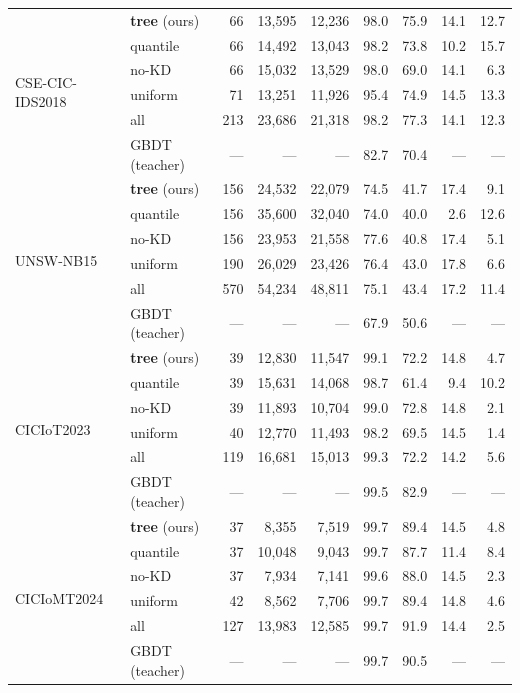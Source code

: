 \begin{table}[!ht]
{\begin{tabular}{l l r r r r r r r}
\midrule
\multirow{6}{*}{CSE-CIC-IDS2018}
& \textbf{tree} (ours) & 66 & 13,595 & 12,236 & 98.0 & 75.9 & 14.1 & 12.7 \\
& quantile & 66 & 14,492 & 13,043 & 98.2 & 73.8 & 10.2 & 15.7 \\
& no-KD & 66 & 15,032 & 13,529 & 98.0 & 69.0 & 14.1 & 6.3 \\
& uniform & 71 & 13,251 & 11,926 & 95.4 & 74.9 & 14.5 & 13.3 \\
& all & 213 & 23,686 & 21,318 & 98.2 & 77.3 & 14.1 & 12.3 \\
& GBDT (teacher) & --- & --- & --- & 82.7 & 70.4 & --- & --- \\
\midrule
\multirow{6}{*}{UNSW-NB15}
& \textbf{tree} (ours) & 156 & 24,532 & 22,079 & 74.5 & 41.7 & 17.4 & 9.1 \\
& quantile & 156 & 35,600 & 32,040 & 74.0 & 40.0 & 2.6 & 12.6 \\
& no-KD & 156 & 23,953 & 21,558 & 77.6 & 40.8 & 17.4 & 5.1 \\
& uniform & 190 & 26,029 & 23,426 & 76.4 & 43.0 & 17.8 & 6.6 \\
& all & 570 & 54,234 & 48,811 & 75.1 & 43.4 & 17.2 & 11.4 \\
& GBDT (teacher) & --- & --- & --- & 67.9 & 50.6 & --- & --- \\
\midrule
\multirow{6}{*}{CICIoT2023}
& \textbf{tree} (ours) & 39 & 12,830 & 11,547 & 99.1 & 72.2 & 14.8 & 4.7 \\
& quantile & 39 & 15,631 & 14,068 & 98.7 & 61.4 & 9.4 & 10.2 \\
& no-KD & 39 & 11,893 & 10,704 & 99.0 & 72.8 & 14.8 & 2.1 \\
& uniform & 40 & 12,770 & 11,493 & 98.2 & 69.5 & 14.5 & 1.4 \\
& all & 119 & 16,681 & 15,013 & 99.3 & 72.2 & 14.2 & 5.6 \\
& GBDT (teacher) & --- & --- & --- & 99.5 & 82.9 & --- & --- \\
\midrule
\multirow{6}{*}{CICIoMT2024}
& \textbf{tree} (ours) & 37 & 8,355 & 7,519 & 99.7 & 89.4 & 14.5 & 4.8 \\
& quantile & 37 & 10,048 & 9,043 & 99.7 & 87.7 & 11.4 & 8.4 \\
& no-KD & 37 & 7,934 & 7,141 & 99.6 & 88.0 & 14.5 & 2.3 \\
& uniform & 42 & 8,562 & 7,706 & 99.7 & 89.4 & 14.8 & 4.6 \\
& all & 127 & 13,983 & 12,585 & 99.7 & 91.9 & 14.4 & 2.5 \\
& GBDT (teacher) & --- & --- & --- & 99.7 & 90.5 & --- & --- \\

\end{tabular}}
\end{table}
